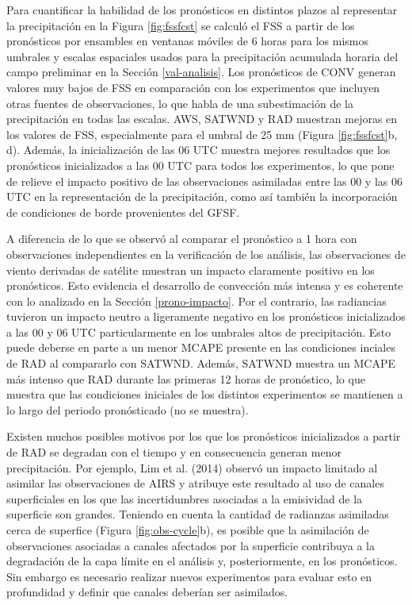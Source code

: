 \documentclass[12pt,oneside,a4paper]{reedthesis}
\begin{document}
Para cuantificar la habilidad de los pronósticos en distintos plazos al representar la precipitación en la Figura \ref{fig:fssfcst} se calculó el FSS a partir de los pronósticos por ensambles en ventanas móviles de 6 horas para los mismos umbrales y escalas espaciales usados para la precipitación acumulada horaria del campo preliminar en la Sección \ref{val-analisis}. Los pronósticos de CONV generan valores muy bajos de FSS en comparación con los experimentos que incluyen otras fuentes de observaciones, lo que habla de una subestimación de la precipitación en todas las escalas. AWS, SATWND y RAD muestran mejoras en los valores de FSS, especialmente para el umbral de 25 mm (Figura \ref{fig:fssfcst}b, d). Además, la inicialización de las 06 UTC muestra mejores resultados que los pronósticos inicializados a las 00 UTC para todos los experimentos, lo que pone de relieve el impacto positivo de las observaciones asimiladas entre las 00 y las 06 UTC en la representación de la precipitación, como así también la incorporación de condiciones de borde provenientes del GFSF.

A diferencia de lo que se observó al comparar el pronóstico a 1 hora con observaciones independientes en la verificación de los análisis, las observaciones de viento derivadas de satélite muestran un impacto claramente positivo en los pronósticos. Esto evidencia el desarrollo de convección más intensa y es coherente con lo analizado en la Sección \ref{prono-impacto}. Por el contrario, las radiancias tuvieron un impacto neutro a ligeramente negativo en los pronósticos inicializados a las 00 y 06 UTC particularmente en los umbrales altos de precipitación. Esto puede deberse en parte a un menor MCAPE presente en las condiciones inciales de RAD al compararlo con SATWND. Además, SATWND muestra un MCAPE más intenso que RAD durante las primeras 12 horas de pronóstico, lo que muestra que las condiciones iniciales de los distintos experimentos se mantienen a lo largo del periodo pronósticado (no se muestra).

Existen muchos posibles motivos por los que los pronósticos inicializados a partir de RAD se degradan con el tiempo y en consecuencia generan menor precipitación. Por ejemplo, Lim et al. (2014) observó un impacto limitado al asimilar las observaciones de AIRS y atribuye este resultado al uso de canales superficiales en los que las incertidumbres asociadas a la emisividad de la superficie son grandes. Teniendo en cuenta la cantidad de radianzas asimiladas cerca de superfice (Figura \ref{fig:obs-cycle}b), es posible que la asimilación de observaciones asociadas a canales afectados por la superficie contribuya a la degradación de la capa límite en el análisis y, posteriormente, en los pronósticos. Sin embargo es necesario realizar nuevos experimentos para evaluar esto en profundidad y definir que canales deberían ser asimilados.
\end{document}
